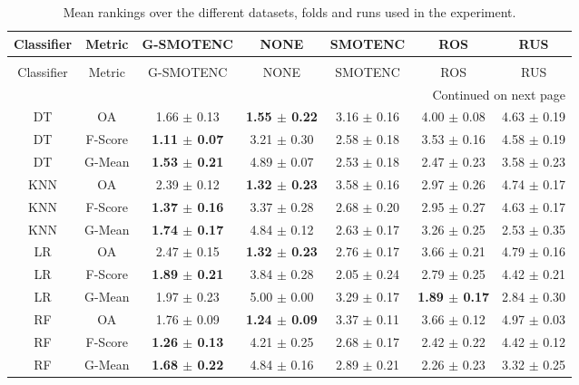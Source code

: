 \begin{longtable}{ccccccc}
\caption{Mean rankings over the different datasets, folds and runs used in the experiment.}
\label{tbl:mean_sem_ranks}\\
\toprule
Classifier &  Metric &                G-SMOTENC &                     NONE &         SMOTENC &                      ROS &             RUS \\
\midrule
\endfirsthead
\caption[]{Mean rankings over the different datasets, folds and runs used in the experiment.} \\
\toprule
Classifier &  Metric &                G-SMOTENC &                     NONE &         SMOTENC &                      ROS &             RUS \\
\midrule
\endhead
\midrule
\multicolumn{7}{r}{{Continued on next page}} \\
\midrule
\endfoot

\bottomrule
\endlastfoot
        DT &      OA &          1.66 $\pm$ 0.13 & \textbf{1.55 $\pm$ 0.22} & 3.16 $\pm$ 0.16 &          4.00 $\pm$ 0.08 & 4.63 $\pm$ 0.19 \\
        DT & F-Score & \textbf{1.11 $\pm$ 0.07} &          3.21 $\pm$ 0.30 & 2.58 $\pm$ 0.18 &          3.53 $\pm$ 0.16 & 4.58 $\pm$ 0.19 \\
        DT &  G-Mean & \textbf{1.53 $\pm$ 0.21} &          4.89 $\pm$ 0.07 & 2.53 $\pm$ 0.18 &          2.47 $\pm$ 0.23 & 3.58 $\pm$ 0.23 \\
       KNN &      OA &          2.39 $\pm$ 0.12 & \textbf{1.32 $\pm$ 0.23} & 3.58 $\pm$ 0.16 &          2.97 $\pm$ 0.26 & 4.74 $\pm$ 0.17 \\
       KNN & F-Score & \textbf{1.37 $\pm$ 0.16} &          3.37 $\pm$ 0.28 & 2.68 $\pm$ 0.20 &          2.95 $\pm$ 0.27 & 4.63 $\pm$ 0.17 \\
       KNN &  G-Mean & \textbf{1.74 $\pm$ 0.17} &          4.84 $\pm$ 0.12 & 2.63 $\pm$ 0.17 &          3.26 $\pm$ 0.25 & 2.53 $\pm$ 0.35 \\
        LR &      OA &          2.47 $\pm$ 0.15 & \textbf{1.32 $\pm$ 0.23} & 2.76 $\pm$ 0.17 &          3.66 $\pm$ 0.21 & 4.79 $\pm$ 0.16 \\
        LR & F-Score & \textbf{1.89 $\pm$ 0.21} &          3.84 $\pm$ 0.28 & 2.05 $\pm$ 0.24 &          2.79 $\pm$ 0.25 & 4.42 $\pm$ 0.21 \\
        LR &  G-Mean &          1.97 $\pm$ 0.23 &          5.00 $\pm$ 0.00 & 3.29 $\pm$ 0.17 & \textbf{1.89 $\pm$ 0.17} & 2.84 $\pm$ 0.30 \\
        RF &      OA &          1.76 $\pm$ 0.09 & \textbf{1.24 $\pm$ 0.09} & 3.37 $\pm$ 0.11 &          3.66 $\pm$ 0.12 & 4.97 $\pm$ 0.03 \\
        RF & F-Score & \textbf{1.26 $\pm$ 0.13} &          4.21 $\pm$ 0.25 & 2.68 $\pm$ 0.17 &          2.42 $\pm$ 0.22 & 4.42 $\pm$ 0.12 \\
        RF &  G-Mean & \textbf{1.68 $\pm$ 0.22} &          4.84 $\pm$ 0.16 & 2.89 $\pm$ 0.21 &          2.26 $\pm$ 0.23 & 3.32 $\pm$ 0.25 \\
\end{longtable}
